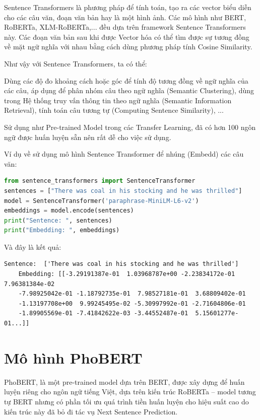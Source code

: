 Sentence Transformers là phương pháp để tính toán, tạo ra các vector biểu diễn cho các câu văn, đoạn văn bản hay là một hình ảnh. Các mô hình như BERT, RoBERTa, XLM-RoBERTa,... đều dựa trên framework Sentence Transformers này. Các đoạn văn bản sau khi được Vector hóa có thể tìm được sự tương đồng về mặt ngữ nghĩa với nhau bằng cách dùng phương pháp tính Cosine Similarity.

Như vậy với Sentence Transformers, ta có thể:

Dùng các độ đo khoảng cách hoặc góc để tính độ tương đồng về ngữ nghĩa của các câu, áp dụng để phân nhóm câu theo ngữ nghĩa (Semantic Clustering), dùng trong Hệ thống truy vấn thông tin theo ngữ nghĩa (Semantic Information Retrieval), tính toán câu tương tự (Computing Sentence Similarity), ...

Sử dụng như Pre-trained Model trong các Transfer Learning, đã có hơn 100 ngôn ngữ được huấn luyện sẵn nên rất dễ cho việc sử dụng.

\pagebreak
Ví dụ về sử dụng mô hình Sentence Transformer để nhúng (Embedd) các câu văn:
\begin{lstlisting}[language=python]
from sentence_transformers import SentenceTransformer
sentences = ["There was coal in his stocking and he was thrilled"]
model = SentenceTransformer('paraphrase-MiniLM-L6-v2')
embeddings = model.encode(sentences)
print("Sentence: ", sentences)
print("Embedding: ", embeddings)
\end{lstlisting}

Và đây là kết quả:
\begin{lstlisting}
Sentence:  ['There was coal in his stocking and he was thrilled']
	Embedding: [[-3.29191387e-01  1.03968787e+00 -2.23834172e-01  7.96381384e-02
	-7.98925042e-01 -1.18792735e-01  7.98527181e-01  3.68809402e-01
	-1.13197708e+00  9.99245495e-02 -5.30997992e-01 -2.71604806e-01
	-1.89905569e-01 -7.41842622e-03 -3.44552487e-01  5.15601277e-01...]]	
\end{lstlisting}

\section{Mô hình PhoBERT}

PhoBERT\cite{PhoBERT},\cite{PhoBERT_VNMESE}  là một pre-trained model dựa trên BERT, được xây dựng để huấn luyện riêng cho ngôn ngữ tiếng Việt, dựa trên kiến trúc RoBERTa – model tương tự BERT nhưng có phần tối ưu quá trình tiền huấn luyện cho hiệu suất cao do kiến trúc này đã bỏ đi tác vụ Next Sentence Prediction. 


